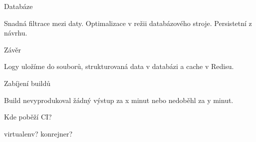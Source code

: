 \secc Databáze

Snadná filtrace mezi daty.
Optimalizace v režii databázového stroje.
Persistetní z návrhu.

\secc Závěr

Logy uložíme do souborů, strukturovaná data v databázi a cache v Redisu.

\sec Zabíjení buildů

Build nevyprodukoval žádný výstup za x minut nebo nedoběhl za y minut.

\sec Kde poběží CI?

virtualenv?
konrejner?
